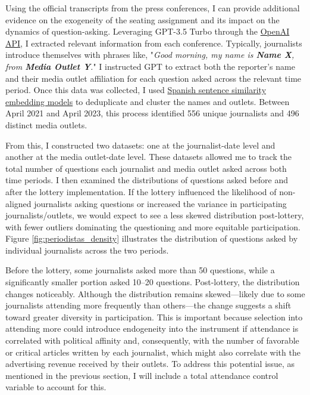 Using the official transcripts from the press conferences, I can provide additional evidence on the exogeneity of the seating assignment and its impact on the dynamics of question-asking. Leveraging GPT-3.5 Turbo through the \href{https://platform.openai.com/docs/api-reference/introduction}{OpenAI API}, I extracted relevant information from each conference. Typically, journalists introduce themselves with phrases like, "\textit{Good morning, my name is \textbf{Name X}, from \textbf{Media Outlet Y}.}" I instructed GPT to extract both the reporter's name and their media outlet affiliation for each question asked across the relevant time period. Once this data was collected, I used \href{https://huggingface.co/hiiamsid/sentence_similarity_spanish_es}{Spanish sentence similarity embedding models} to deduplicate and cluster the names and outlets. Between April 2021 and April 2023, this process identified 556 unique journalists and 496 distinct media outlets.

From this, I constructed two datasets: one at the journalist-date level and another at the media outlet-date level. These datasets allowed me to track the total number of questions each journalist and media outlet asked across both time periods. I then examined the distributions of questions asked before and after the lottery implementation. If the lottery influenced the likelihood of non-aligned journalists asking questions or increased the variance in participating journalists/outlets, we would expect to see a less skewed distribution post-lottery, with fewer outliers dominating the questioning and more equitable participation. Figure \ref{fig:periodistas_density} illustrates the distribution of questions asked by individual journalists across the two periods.

Before the lottery, some journalists asked more than 50 questions, while a significantly smaller portion asked 10–20 questions. Post-lottery, the distribution changes noticeably. Although the distribution remains skewed—likely due to some journalists attending more frequently than others—the change suggests a shift toward greater diversity in participation. This is important because selection into attending more could introduce endogeneity into the instrument if attendance is correlated with political affinity and, consequently, with the number of favorable or critical articles written by each journalist, which might also correlate with the advertising revenue received by their outlets. To address this potential issue, as mentioned in the previous section, I will include a total attendance control variable to account for this.

